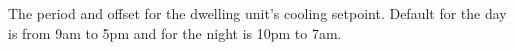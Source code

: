 The period and offset for the dwelling unit's cooling setpoint. Default for the day is from 9am to 5pm and for the night is 10pm to 7am.
